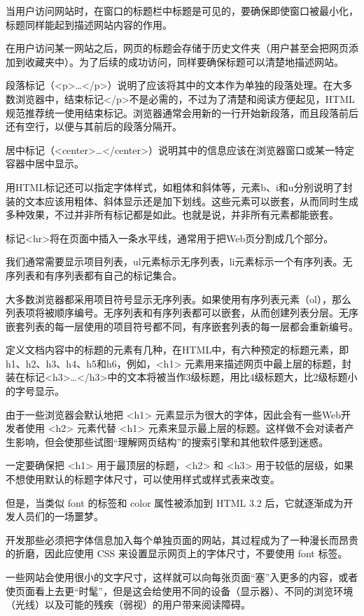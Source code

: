 当用户访问网站时，在窗口的标题栏中标题是可见的，要确保即使窗口被最小化，标题同样能起到描述网站内容的作用。

在用户访问某一网站之后，网页的标题会存储于历史文件夹（用户甚至会把网页添加到收藏夹中）。为了后续的成功访问，同样要确保标题可以清楚地描述网站。

段落标记（<p>…</p>）说明了应该将其中的文本作为单独的段落处理。在大多数浏览器中，结束标记</p>不是必需的，不过为了清楚和阅读方便起见，HTML规范推荐统一使用结束标记。浏览器通常会用新的一行开始新段落，而且段落前后还有空行，以便与其前后的段落分隔开。

居中标记（<center>…</center>）说明其中的信息应该在浏览器窗口或某一特定容器中居中显示。

用HTML标记还可以指定字体样式，如粗体和斜体等，元素b、i和u分别说明了封装的文本应该用粗体、斜体显示还是加下划线。这些元素可以嵌套，从而同时生成多种效果，不过并非所有标记都是如此。也就是说，并非所有元素都能嵌套。

标记<hr>将在页面中插入一条水平线，通常用于把Web页分割成几个部分。

我们通常需要显示项目列表，ul元素标示无序列表，li元素标示一个有序列表。无序列表和有序列表都有自己的标记集合。

大多数浏览器都采用项目符号显示无序列表。如果使用有序列表元素（ol），那么列表项将被顺序编号。无序列表和有序列表都可以嵌套，从而创建列表分层。无序嵌套列表的每一层使用的项目符号都不同，有序嵌套列表的每一层都会重新编号。

定义文档内容中的标题的元素有几种，在HTML中，有六种预定的标题元素，即h1、h2、h3、h4、h5和h6，例如，<h1> 元素用来描述网页中最上层的标题，封装在标记<h3>…</h3>中的文本将被当作3级标题，用比4级标题大，比2级标题小的字号显示。

由于一些浏览器会默认地把 <h1> 元素显示为很大的字体，因此会有一些Web开发者使用 <h2> 元素代替 <h1> 元素来显示最上层的标题。这样做不会对读者产生影响，但会使那些试图“理解网页结构”的搜索引擎和其他软件感到迷惑。

一定要确保把 <h1> 用于最顶层的标题，<h2> 和 <h3> 用于较低的层级，如果不想使用默认的标题字体尺寸，可以使用样式或样式表来改变。


但是，当类似 font 的标签和 color 属性被添加到 HTML 3.2 后，它就逐渐成为开发人员们的一场噩梦。

开发那些必须把字体信息加入每个单独页面的网站，其过程成为了一种漫长而昂贵的折磨，因此应使用 CSS 来设置显示网页上的字体尺寸，不要使用 font 标签。

一些网站会使用很小的文字尺寸，这样就可以向每张页面“塞”入更多的内容，或者使页面看上去更“时髦”，但是这会给使用不同的设备（显示器）、不同的浏览环境（光线）以及可能的残疾（弱视）的用户带来阅读障碍。

